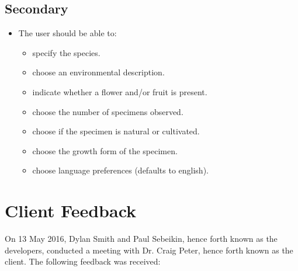 \documentclass[12pt,a4paper,oneside]{report}
\begin{document}
	\subsection{Secondary}
		\begin{itemize}
			\item The user should be able to:
			 	\begin{itemize}
					\item specify the species.
					\item choose an environmental description.
					\item indicate whether a flower and/or fruit is present.
					\item choose the number of specimens observed.
					\item choose if the specimen is natural or cultivated.
					\item choose the growth form of the specimen.
					\item choose language preferences (defaults to english).
			 	\end{itemize}
	  \end{itemize}

\section{Client Feedback}
	On 13 May 2016, Dylan Smith and Paul Sebeikin, hence forth known as the developers, conducted a meeting with Dr. Craig Peter, hence forth known as the client.  The following feedback was received:
\end{document}
